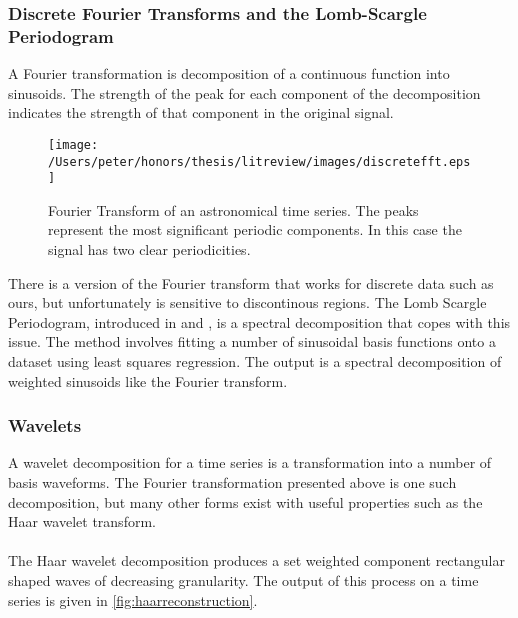 	\subsubsection{Discrete Fourier Transforms and the Lomb-Scargle Periodogram}
	A Fourier transformation is decomposition of a continuous function into sinusoids. The strength of the peak for each component of the decomposition indicates the strength of that component in the original signal. 
	\begin{figure}[ht!]
	\centering
	\texttt{[image: /Users/peter/honors/thesis/litreview/images/discretefft.eps]}
	\label{fig:fouriertransform}
	\caption{Fourier Transform of an astronomical time series. The peaks represent the most significant periodic components. In this case the signal has two clear periodicities.}
	\end{figure}
	There is a version of the Fourier transform that works for discrete data such as ours, but unfortunately is sensitive to discontinous regions. The Lomb Scargle Periodogram, introduced in \citep{lomb1976least} and \citep{scargle1982studies}, is a spectral decomposition that copes with this issue. The method involves fitting a number of sinusoidal basis functions onto a dataset using least squares regression. The output is a spectral decomposition of weighted sinusoids like the Fourier transform.
	

	\subsubsection{Wavelets}
	A wavelet decomposition for a time series is a transformation into a number of basis waveforms. The Fourier transformation presented above is one such decomposition, but many other forms exist with useful properties such as the Haar wavelet transform. 
	\paragraph{}
	The Haar wavelet decomposition produces a set weighted component rectangular shaped waves of decreasing granularity. The output of this process on a time series is given in \ref{fig:haarreconstruction}.

